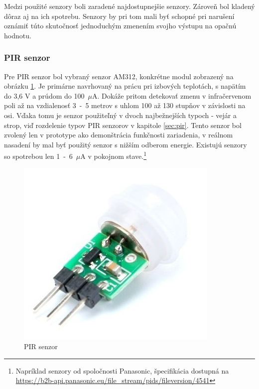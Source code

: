 Medzi použité senzory boli zaradené najdostupnejšie senzory. Zároveň bol kladený dôraz aj na ich spotrebu. Senzory by pri tom mali byť schopné pri narušení oznámiť túto skutočnosť jednoduchým zmenením svojho výstupu na opačnú hodnotu.

\subsubsection{PIR senzor}

Pre PIR senzor bol vybraný senzor AM312, konkrétne modul zobrazený na obrázku \ref{fig:pir}. Je primárne navrhovaný na prácu pri izbových teplotách, s napätím do 3,6 V a prúdom do 100~$\mu$A. Dokáže pritom detekovať zmenu v infračervenom poli až na vzdialenosť 3~-~5 metrov s uhlom 100 až 130 stupňov v závislosti na osi. Vďaka tomu je senzor použiteľný v dvoch najbežnejších typoch - vejár a strop, viď rozdelenie typov PIR senzorov v kapitole \ref{sec:pir}.\cite{pir-datasheet}
Tento senzor bol zvolený len v prototype ako demonštrácia funkčnosti zariadenia, v reálnom nasadení by mal byť použitý senzor s nižším odberom energie. Existujú senzory so spotrebou len 1~-~6~$\mu$A v pokojnom stave.\footnote{Napríklad senzory od spoločnosti Panasonic, špecifikácia dostupná na \url{https://b2b-api.panasonic.eu/file_stream/pids/fileversion/4541}}

\begin{figure}[ht]
    \centering
    \includegraphics[scale=0.5]{obrazky-figures/pir.jpg}
    \caption[PIR senzor]{PIR senzor\footnotemark}
    \label{fig:pir}
\end{figure}

